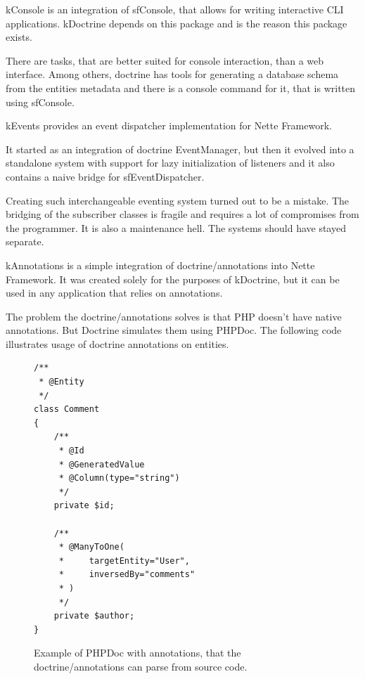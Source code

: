  \label{sec:state:console}

\gls{kConsole} is an integration of \gls{sfConsole}, that allows for writing interactive CLI applications. \gls{kDoctrine} depends on this package and is the reason this package exists.

There are tasks, that are better suited for console interaction, than a web interface. Among others, \gls{doctrine} has tools for generating a database schema from the entities metadata and there is a console command for it, that is written using \gls{sfConsole}.

 \label{sec:state:events}

\gls{kEvents} provides an event dispatcher implementation for Nette Framework.

It started as an integration of \gls{doctrine} EventManager, but then it evolved into a standalone system with support for lazy initialization of listeners and it also contains a naive bridge for \gls{sfEventDispatcher}.

Creating such interchangeable eventing system turned out to be a mistake. The bridging of the subscriber classes is fragile and requires a lot of compromises from the programmer. It is also a maintenance hell. The systems should have stayed separate.

 \label{sec:state:annotations}

\gls{kAnnotations} is a simple integration of doctrine/annotations into Nette Framework. It was created solely for the purposes of \gls{kDoctrine}, but it can be used in any application that relies on annotations.

The problem the doctrine/annotations solves is that PHP doesn't have native annotations. But Doctrine simulates them using PHPDoc. The following code illustrates usage of \gls{doctrine} annotations on entities.

\begin{figure}[h] \label{fig:php:annotations-example}
\begin{lstlisting}
/**
 * @Entity
 */
class Comment
{
    /**
     * @Id
     * @GeneratedValue
     * @Column(type="string")
     */
    private $id;

    /**
     * @ManyToOne(
     *     targetEntity="User",
     *     inversedBy="comments"
     * )
     */
    private $author;
}
\end{lstlisting}
\caption{Example of PHPDoc with annotations, that the doctrine/annotations can parse from source code.}
\end{figure}


